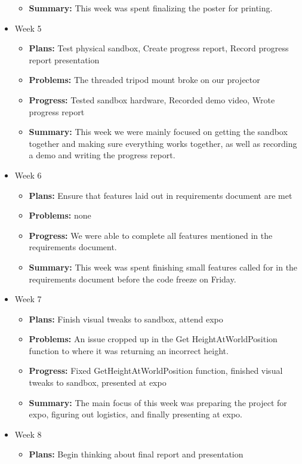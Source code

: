 \documentclass[onecolumn, draftclsnofoot,10pt, compsoc]{IEEEtran}
\begin{document}
\begin{itemize}
\begin{itemize}
    \item \textbf{Summary:} This week was spent finalizing the poster for printing.
	\end{itemize}
\item Week 5
	\begin{itemize}
	\item \textbf{Plans:} Test physical sandbox, Create progress report, Record progress report presentation
    \item \textbf{Problems:} The threaded tripod mount broke on our projector
    \item \textbf{Progress:} Tested sandbox hardware, Recorded demo video, Wrote progress report
    \item \textbf{Summary:} This week we were mainly focused on getting the sandbox together and making sure everything works together, as well as recording a demo and writing the progress report.
	\end{itemize}
\item Week 6
	\begin{itemize}
	\item \textbf{Plans:} Ensure that features laid out in requirements document are met
    \item \textbf{Problems:} none 
    \item \textbf{Progress:} We were able to complete all features mentioned in the requirements document.
    \item \textbf{Summary:} This week was spent finishing small features called for in the requirements document before the code freeze on Friday.
	\end{itemize}
\item Week 7
	\begin{itemize}
	\item \textbf{Plans:} Finish visual tweaks to sandbox, attend expo
    \item \textbf{Problems:} An issue cropped up in the Get HeightAtWorldPosition function to where it was returning an incorrect height.
    \item \textbf{Progress:} Fixed GetHeightAtWorldPosition function, finished visual tweaks to sandbox, presented at expo
    \item \textbf{Summary:} The main focus of this week was preparing the project for expo, figuring out logistics, and finally presenting at expo.
	\end{itemize}
\item Week 8
	\begin{itemize}
	\item \textbf{Plans:} Begin thinking about final report and presentation

\end{itemize}
\end{itemize}
\end{document}
